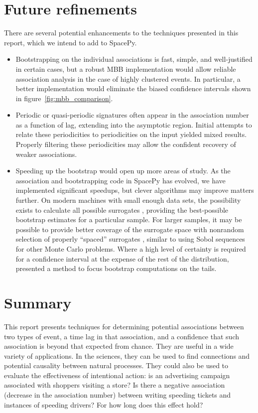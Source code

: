 \documentclass[letterpaper,11pt]{article}
\begin{document}
\section{Future refinements}
\label{sec:future}
There are several potential enhancements to the techniques presented
in this report, which we intend to add to SpacePy.
\begin{itemize}
\item Bootstrapping on the individual associations is fast, simple,
and well-justified in certain cases, but a robust MBB implementation
would allow reliable association analysis in the case of
highly clustered events. In particular, a better implementation would
eliminate the biased confidence intervals shown in
figure~\ref{fig:mbb_comparison}.
\item Periodic or quasi-periodic signatures often appear in the
association number as a function of lag, extending into the asymptotic
region. Initial attempts to relate these periodicities to
periodicities on the input yielded mixed results. Properly filtering
these periodicities may allow the confident recovery of weaker
associations.
\item Speeding up the bootstrap would open up more areas of study. As
the association and bootstrapping code in SpacePy has evolved, we have
implemented significant speedups, but clever algorithms may improve
matters further. On modern machines with small enough data sets, the
possibility exists to calculate all possible surrogates
\citep{diaconis94a}, providing the best-possible bootstrap estimates
for a particular sample. For larger samples, it may be possible to
provide better coverage of the surrogate space with nonrandom
selection of properly ``spaced'' surrogates \citep{diaconis96},
similar to using Sobol sequences for other Monte Carlo problems. Where
a high level of certainty is required for a confidence interval at the
expense of the rest of the distribution, \citet{diaconis94b} presented
a method to focus bootstrap computations on the tails.
\end{itemize}

\section{Summary}
\label{sec:concl}
This report presents techniques for determining potential associations
between two types of event, a time lag in that association, and a
confidence that such association is beyond that expected from
chance. They are useful in a wide variety of applications. In the
sciences, they can be used to find connections and potential causality
between natural processes. They could also be used to evaluate the
effectiveness of intentional action: is an advertising campaign
associated with shoppers visiting a store? Is there a negative
association (decrease in the association number) between writing
speeding tickets and instances of speeding drivers? For how long does
this effect hold?
\end{document}
